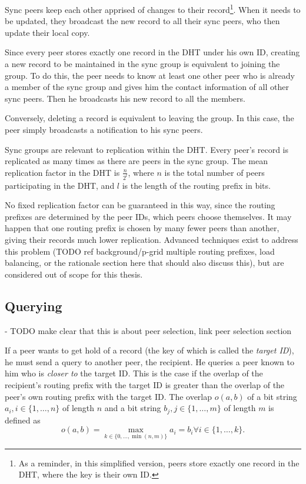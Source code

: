 Sync peers keep each other apprised of changes to their record\footnote{As a
reminder, in this simplified version, peers store exactly one record in the
\ac{DHT}, where the key is their own ID.}. When it needs to be updated, they
broadcast the new record to all their sync peers, who then update their local
copy.

Since every peer stores exactly one record in the \ac{DHT} under his own ID,
creating a new record to be maintained in the sync group is equivalent to
joining the group. To do this, the peer needs to know at least one other peer
who is already a member of the sync group and gives him the contact information
of all other sync peers. Then he broadcasts his new record to all the members.

Conversely, deleting a record is equivalent to leaving the group. In this case,
the peer simply broadcasts a notification to his sync peers.

Sync groups are relevant to replication within the \ac{DHT}. Every peer's record
is replicated as many times as there are peers in the sync group. The mean
replication factor in the \ac{DHT} is $\frac{n}{2^l}$, where $n$ is the total
number of peers participating in the \ac{DHT}, and $l$ is the length of the
routing prefix in bits.

No fixed replication factor can be guaranteed in this way, since the routing
prefixes are determined by the peer IDs, which peers choose themselves. It may
happen that one routing prefix is chosen by many fewer peers than another,
giving their records much lower replication. Advanced techniques exist to
address this problem (TODO ref background/p-grid multiple routing prefixes, load
balancing, or the rationale section here that should also discuss this), but are
considered out of scope for this thesis.

\subsection{Querying}
\label{sec:desc_querying}
- TODO make clear that this is about peer selection, link peer selection section

If a peer wants to get hold of a record (the key of which is called the
\emph{target ID}), he must send a query to another peer, the recipient. He
queries a peer known to him who is \emph{closer to} the target ID. This is the
case if the overlap of the recipient's routing prefix with the target ID is
greater than the overlap of the peer's own routing prefix with the target ID.
The overlap $o(a, b)$ of a bit string $a_i, i \in \{1, \ldots, n\}$ of length
$n$ and a bit string $b_j, j \in \{1, \ldots, m\}$ of length $m$ is defined as
\[o(a, b) = \max_{k \in \{0, \ldots, \min(n, m)\}} a_i = b_i \forall i \in \{1,
\ldots, k\}.\]

